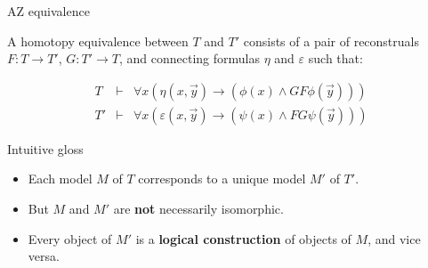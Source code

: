 \documentclass[17pt]{beamer}
\begin{document}
\begin{frame}{AZ equivalence}

  A homotopy equivalence between $T$ and $T'$ consists of a pair of
  reconstruals $F:T\to T'$, $G:T'\to T$, and connecting formulas
  $\eta$ and $\varepsilon$ such that:

  \[ \begin{array}{lll}

  T & \vdash & \forall x(\eta (x,\vec{y})\to (\phi (x)\wedge GF\phi
               (\vec{y})))  \\
  T' & \vdash & \forall x(\varepsilon (x,\vec{y})\to (\psi (x)\wedge
                FG\psi (\vec{y}))) \end{array} \]

\end{frame}            

\begin{frame}{Intuitive gloss}

  \begin{itemize}
  \item Each model $M$ of $T$ corresponds to a unique model $M'$ of $T'$.  
  \item But $M$ and $M'$ are \textbf{not} necessarily isomorphic.  
  \item Every object of $M'$ is a \textbf{logical construction} of
    objects of $M$, and vice versa.
  \end{itemize}


\end{frame}


\end{document}
